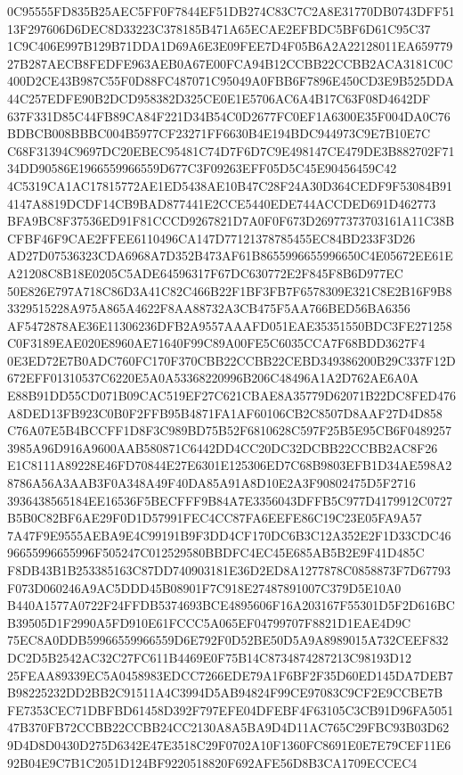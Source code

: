 \documentclass[UTF8,fontset=fandol,zihao=-4,a4paper]{ctexart}
\begin{document}
{{0C95555FD835B25AEC5FF0F7844EF51DB274C83C7C2A8E31770DB0743DFF5113F297606D6DEC8D33223C378185B471A65ECAE2EFBDC5BF6D61C95C37
1C9C406E997B129B71DDA1D69A6E3E09FEE7D4F05B6A2A22128011EA65977927B287AECB8FEDFE963AEB0A67E00FCA94B12CCBB22CCBB2ACA3181C0C
400D2CE43B987C55F0D88FC487071C95049A0FBB6F7896E450CD3E9B525DDA44C257EDFE90B2DCD958382D325CE0E1E5706AC6A4B17C63F08D4642DF
637F331D85C44FB89CA84F221D34B54C0D2677FC0EF1A6300E35F004DA0C76BDBCB008BBBC004B5977CF23271FF6630B4E194BDC944973C9E7B10E7C
C68F31394C9697DC20EBEC95481C74D7F6D7C9E498147CE479DE3B882702F7134DD90586E1966559966559D677C3F09263EFF05D5C45E90456459C42
4C5319CA1AC17815772AE1ED5438AE10B47C28F24A30D364CEDF9F53084B914147A8819DCDF14CB9BAD877441E2CCE5440EDE744ACCDED691D462773
BFA9BC8F37536ED91F81CCCD9267821D7A0F0F673D26977373703161A11C38BCFBF46F9CAE2FFEE6110496CA147D77121378785455EC84BD233F3D26
AD27D07536323CDA6968A7D352B473AF61B8655996655996650C4E05672EE61EA21208C8B18E0205C5ADE64596317F67DC630772E2F845F8B6D977EC
50E826E797A718C86D3A41C82C466B22F1BF3FB7F6578309E321C8E2B16F9B83329515228A975A865A4622F8AA88732A3CB475F5AA766BED56BA6356
AF5472878AE36E11306236DFB2A9557AAAFD051EAE35351550BDC3FE271258C0F3189EAE020E8960AE71640F99C89A00FE5C6035CCA7F68BDD3627F4
0E3ED72E7B0ADC760FC170F370CBB22CCBB22CEBD349386200B29C337F12D672EFF01310537C6220E5A0A53368220996B206C48496A1A2D762AE6A0A
E88B91DD55CD071B09CAC519EF27C621CBAE8A35779D62071B22DC8FED476A8DED13FB923C0B0F2FFB95B4871FA1AF60106CB2C8507D8AAF27D4D858
C76A07E5B4BCCFF1D8F3C989BD75B52F6810628C597F25B5E95CB6F04892573985A96D916A9600AAB580871C6442DD4CC20DC32DCBB22CCBB2AC8F26
E1C8111A89228E46FD70844E27E6301E125306ED7C68B9803EFB1D34AE598A28786A56A3AAB3F0A348A49F40DA85A91A8D10E2A3F90802475D5F2716
3936438565184EE16536F5BECFFF9B84A7E3356043DFFB5C977D4179912C0727B5B0C82BF6AE29F0D1D57991FEC4CC87FA6EEFE86C19C23E05FA9A57
7A47F9E9555AEBA9E4C99191B9F3DD4CF170DC6B3C12A352E2F1D33CDC4696655996655996F505247C012529580BBDFC4EC45E685AB5B2E9F41D485C
F8DB43B1B253385163C87DD740903181E36D2ED8A1277878C0858873F7D67793F073D060246A9AC5DDD45B08901F7C918E27487891007C379D5E10A0
B440A1577A0722F24FFDB5374693BCE4895606F16A203167F55301D5F2D616BCB39505D1F2990A5FD910E61FCCC5A065EF04799707F8821D1EAE4D9C
75EC8A0DDB59966559966559D6E792F0D52BE50D5A9A8989015A732CEEF832DC2D5B2542AC32C27FC611B4469E0F75B14C8734874287213C98193D12
25FEAA89339EC5A0458983EDCC7266EDE79A1F6BF2F35D60ED145DA7DEB7B98225232DD2BB2C91511A4C3994D5AB94824F99CE97083C9CF2E9CCBE7B
FE7353CEC71DBFBD61458D392F797EFE04DFEBF4F63105C3CB91D96FA505147B370FB72CCBB22CCBB24CC2130A8A5BA9D4D11AC765C29FBC93B03D62
9D4D8D0430D275D6342E47E3518C29F0702A10F1360FC8691E0E7E79CEF11E692B04E9C7B1C2051D124BF9220518820F692AFE56D8B3CA1709ECCEC4
}}
\end{document}
